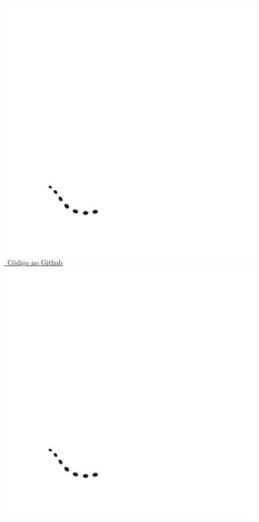 \documentclass[a4paper,11pt,oneside]{book}
\theoremstyle{definition}
\theoremstyle{break}
\begin{document}
\begin{center}
\href{https://github.com/brunoruas2/Meus_Estudos/blob/main/Microeconomia/Microeconomics\%20-\%20Hal\%20Varian/models/cap25.3-demanda_ces_e_monopolio.py}{\includegraphics[scale=0.03]{_github_logo.png} \ Código no Github \includegraphics[scale=0.03]{_github_logo.png}}

\end{center}
\end{document}
